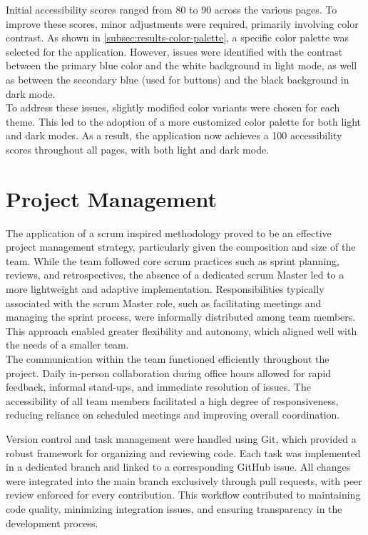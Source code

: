 Initial accessibility scores ranged from 80 to 90 across the various pages. To improve these scores, minor adjustments were required, primarily involving color contrast. As shown in \ref{subsec:results-color-palette}, a specific color palette was selected for the application. However, issues were identified with the contrast between the primary blue color and the white background in light mode, as well as between the secondary blue (used for buttons) and the black background in dark mode. \\

To address these issues, slightly modified color variants were chosen for each theme. This led to the adoption of a more customized color palette for both light and dark modes. As a result, the application now achieves a 100 accessibility scores throughout all pages, with both light and dark mode. 

\section{Project Management}
\label{sec:discussion-project-management}

The application of a \gls{scrum} inspired methodology proved to be an effective project management strategy, particularly given the composition and size of the team. While the team followed core \gls{scrum} practices such as sprint planning, reviews, and retrospectives, the absence of a dedicated \gls{scrum} Master led to a more lightweight and adaptive implementation. Responsibilities typically associated with the \gls{scrum} Master role, such as facilitating meetings and managing the sprint process, were informally distributed among team members. This approach enabled greater flexibility and autonomy, which aligned well with the needs of a smaller team. \\

The communication within the team functioned efficiently throughout the project. Daily in-person collaboration during office hours allowed for rapid feedback, informal stand-ups, and immediate resolution of issues. The accessibility of all team members facilitated a high degree of responsiveness, reducing reliance on scheduled meetings and improving overall coordination.\\

\newpage

Version control and task management were handled using Git, which provided a robust framework for organizing and reviewing code. Each task was implemented in a dedicated branch and linked to a corresponding GitHub issue. All changes were integrated into the main branch exclusively through pull requests, with peer review enforced for every contribution. This workflow contributed to maintaining code quality, minimizing integration issues, and ensuring transparency in the development process. \\

